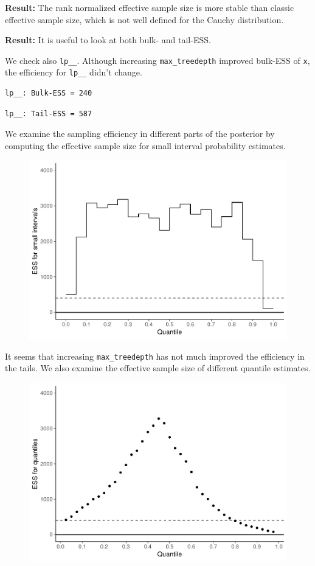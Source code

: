 \documentclass[american,]{article}
\begin{document}
\textbf{Result:} The rank normalized effective sample size is more
stable than classic effective sample size, which is not well defined for
the Cauchy distribution.

\textbf{Result:} It is useful to look at both bulk- and tail-ESS.

We check also \texttt{lp\_\_}. Although increasing
\texttt{max\_treedepth} improved bulk-ESS of \texttt{x}, the efficiency
for \texttt{lp\_\_} didn't change.

\begin{verbatim}
lp__: Bulk-ESS = 240
\end{verbatim}

\begin{verbatim}
lp__: Tail-ESS = 587
\end{verbatim}

We examine the sampling efficiency in different parts of the posterior
by computing the effective sample size for small interval probability
estimates.

\begin{figure}[tp]
  \centering
  \includegraphics[width=0.6\linewidth]{graphics/local-ess-fit-nom-td20-1.pdf}
\end{figure}

It seems that increasing \texttt{max\_treedepth} has not much improved
the efficiency in the tails. We also examine the effective sample size
of different quantile estimates.

\begin{figure}[tp]
  \centering
  \includegraphics[width=0.6\linewidth]{graphics/quantile-ess-fit-nom-td20-1.pdf}
\end{figure}
\end{document}
